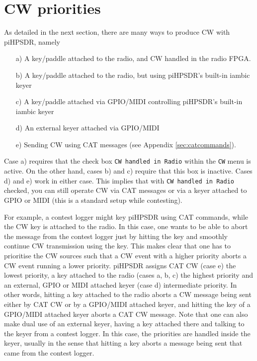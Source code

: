 \documentclass[12pt]{book}
\def\rett#1{\texttt{\color{red}#1}}
\def\bltt#1{\texttt{\color{blue}#1}}
\def\pH{pi\-HPSDR\xspace}
\begin{document}
\section{CW priorities}
As detailed in the next section, there are many ways to produce CW with \pH,
namely
\begin{itemize}
\item[a)]{A key/paddle attached to the radio, and CW handled in the radio FPGA.}
\item[b)]{A key/paddle attached to the radio, but using \pH's built-in iambic keyer}
\item[c)]{A key/paddle attached via GPIO/MIDI controlling \pH's built-in iambic keyer}
\item[d)]{An external keyer attached via GPIO/MIDI}
\item[e)]{Sending CW using CAT messages (see Appendix \ref{sec:catcommands}).}
\end{itemize}

Case a) requires that the check box \rett{CW handled in Radio} within the \bltt{CW} menu
is active. On the other hand, cases b) and c) require that this box is inactive. Cases
d) and e) work in either case. This implies that with \rett{CW handled in Radio} checked,
you can still operate CW via CAT messages or via a keyer attached to GPIO or MIDI
(this is a standard setup while contesting).

For example, a contest logger might key \pH using CAT commands, while the CW key is
attached to the radio. In this case, one wants to be able to abort the message from the contest
logger just by hitting the key and smoothly continue CW transmission using the key. This
makes clear that one has to prioritise the CW sources such that a CW event with a higher
priority aborts a CW event running a lower priority. \pH assigns CAT CW (case e)
the lowest priority, a key attached to the radio (cases a, b, c) the highest priority
and an external, GPIO or MIDI attached keyer (case d) intermediate priority. In other words,
hitting a key attached to the radio aborts a CW message being sent either by CAT CW or
by a GPIO/MIDI attached keyer, and hitting the key of a GPIO/MIDI attached keyer aborts
a CAT CW message. Note that one can also make dual use of an external keyer, having a key
attached there and talking to the keyer from a contest logger. In this case, the priorities
are handled inside the keyer, usually in the sense that hitting a key aborts a message
being sent that came from the contest logger.
\end{document}
